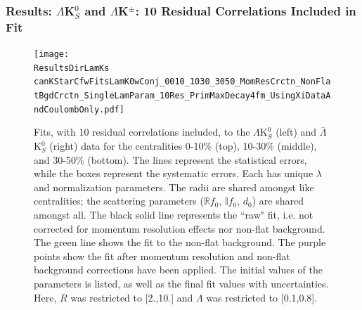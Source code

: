 \documentclass[../AnalysisNoteJBuxton.tex]{subfiles}
\begin{document}
\subsubsection{Results: \texorpdfstring{$\Lambda$K$^{0}_{S}$ and $\Lambda$K$^{\pm}$: 10 Residual Correlations Included in Fit}{TEXT}}
\label{ResultsLamK_10Res}

\begin{figure}[h]
  \centering
  \texttt{[image: \\ResultsDirLamKs canKStarCfwFitsLamK0wConj\_0010\_1030\_3050\_MomResCrctn\_NonFlatBgdCrctn\_SingleLamParam\_10Res\_PrimMaxDecay4fm\_UsingXiDataAndCoulombOnly.pdf]}
  \caption[$\Lambda$K$^{0}_{S}$($\bar{\Lambda}$K$^{0}_{S}$) Fits with 10 Residuals]{Fits, with 10 residual correlations included, to the $\Lambda$K$^{0}_{S}$ (left) and $\bar{\Lambda}$K$^{0}_{S}$ (right) data for the centralities 0-10\% (top), 10-30\% (middle), and 30-50\% (bottom).
The lines represent the statistical errors, while the boxes represent the systematic errors.
Each has unique $\lambda$ and normalization parameters.
The radii are shared amongst like centralities; the scattering parameters ($\mathbb{R}f_{0}$, $\mathbb{I}f_{0}$, $d_{0}$) are shared amongst all.
The black solid line represents the ``raw" fit, i.e. not corrected for momentum resolution effects nor non-flat background.  
The green line shows the fit to the non-flat background.
The purple points show the fit after momentum resolution and non-flat background corrections have been applied.
The initial values of the parameters is listed, as well as the final fit values with uncertainties.
Here, $R$ was restricted to [2.,10.] and $\Lambda$ was restricted to [0.1,0.8].}
  \label{fig:LamK0wConjFits_10Res}
\end{figure}
\end{document}
